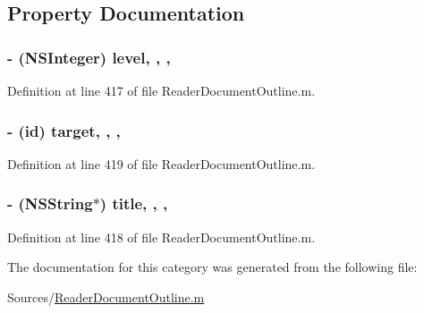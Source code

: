 \subsection{Property Documentation}
\hypertarget{category_document_outline_entry_07_08_a528b075edd4071b08259d6012a2040af}{
\subsubsection[{level}]{\setlength{\rightskip}{0pt plus 5cm}-\/ (N\-S\-Integer) level\hspace{0.3cm}{\ttfamily [read]}, {\ttfamily [write]}, {\ttfamily [nonatomic]}, {\ttfamily [assign]}}}\label{d8/da4/category_document_outline_entry_07_08_a528b075edd4071b08259d6012a2040af}


Definition at line 417 of file Reader\-Document\-Outline.\-m.

\hypertarget{category_document_outline_entry_07_08_a9da4d185e33f0c043de7420cd009f8dd}{
\subsubsection[{target}]{\setlength{\rightskip}{0pt plus 5cm}-\/ (id) target\hspace{0.3cm}{\ttfamily [read]}, {\ttfamily [write]}, {\ttfamily [nonatomic]}, {\ttfamily [strong]}}}\label{d8/da4/category_document_outline_entry_07_08_a9da4d185e33f0c043de7420cd009f8dd}


Definition at line 419 of file Reader\-Document\-Outline.\-m.

\hypertarget{category_document_outline_entry_07_08_ab0bc837797c044f995cd199643689617}{
\subsubsection[{title}]{\setlength{\rightskip}{0pt plus 5cm}-\/ (N\-S\-String$\ast$) title\hspace{0.3cm}{\ttfamily [read]}, {\ttfamily [write]}, {\ttfamily [nonatomic]}, {\ttfamily [strong]}}}\label{d8/da4/category_document_outline_entry_07_08_ab0bc837797c044f995cd199643689617}


Definition at line 418 of file Reader\-Document\-Outline.\-m.



The documentation for this category was generated from the following file\-:\begin{DoxyCompactItemize}
\item 
Sources/\hyperlink{_reader_document_outline_8m}{Reader\-Document\-Outline.\-m}\end{DoxyCompactItemize}
